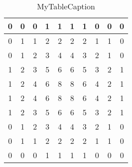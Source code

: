 \documentclass[a4paper,10pt]{article}
\begin{document}
\begin{table}
\centering
\begin{tabular}{|c|c|c|c|c|c|c|c|c|c|}
\hline
0 & 0 & 0 & 1 & 1 & 1 & 1 & 0 & 0 & 0 \\
\hline
0 & 1 & 1 & 2 & 2 & 2 & 2 & 1 & 1 & 0 \\
\hline
0 & 1 & 2 & 3 & 4 & 4 & 3 & 2 & 1 & 0 \\
\hline
1 & 2 & 3 & 5 & 6 & 6 & 5 & 3 & 2 & 1 \\
\hline
1 & 2 & 4 & 6 & 8 & 8 & 6 & 4 & 2 & 1 \\
\hline
1 & 2 & 4 & 6 & 8 & 8 & 6 & 4 & 2 & 1 \\
\hline
1 & 2 & 3 & 5 & 6 & 6 & 5 & 3 & 2 & 1 \\
\hline
0 & 1 & 2 & 3 & 4 & 4 & 3 & 2 & 1 & 0 \\
\hline
0 & 1 & 1 & 2 & 2 & 2 & 2 & 1 & 1 & 0 \\
\hline
0 & 0 & 0 & 1 & 1 & 1 & 1 & 0 & 0 & 0 \\
\hline
\end{tabular}
\caption{MyTableCaption}
\label{table:MyTableLabel}
\end{table}
\end{document}
